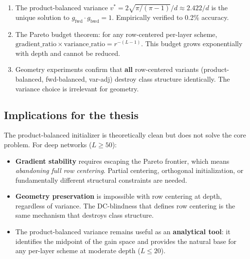 \documentclass[11pt,a4paper]{article}
\theoremstyle{definition}
\begin{document}
\begin{enumerate}
  \item The product-balanced variance $v^{\ast} = 2\sqrt{\pi/(\pi-1)}/d
        \approx 2.422/d$ is the unique solution to
        $g_{\mathrm{fwd}} \cdot g_{\mathrm{bwd}} = 1$.  Empirically
        verified to 0.2\% accuracy.

  \item The Pareto budget theorem: for any row-centered per-layer scheme,
        $\text{gradient\_ratio} \times \text{variance\_ratio} = r^{-(L-1)}$.
        This budget grows exponentially with depth and cannot be reduced.

  \item Geometry experiments confirm that \textbf{all} row-centered variants
        (product-balanced, fwd-balanced, var-adj) destroy class structure
        identically.  The variance choice is irrelevant for geometry.
\end{enumerate}

\subsection{Implications for the thesis}

The product-balanced initializer is theoretically clean but does not solve
the core problem.  For deep networks ($L \geq 50$):

\begin{itemize}
  \item \textbf{Gradient stability} requires escaping the Pareto frontier,
        which means \emph{abandoning full row centering}.  Partial centering,
        orthogonal initialization, or fundamentally different structural
        constraints are needed.

  \item \textbf{Geometry preservation} is impossible with row centering at
        depth, regardless of variance.  The DC-blindness that defines row
        centering is the same mechanism that destroys class structure.

  \item The product-balanced variance remains useful as an \textbf{analytical
        tool}: it identifies the midpoint of the gain space and provides the
        natural base for any per-layer scheme at moderate depth ($L \leq 20$).
\end{itemize}
\end{document}
